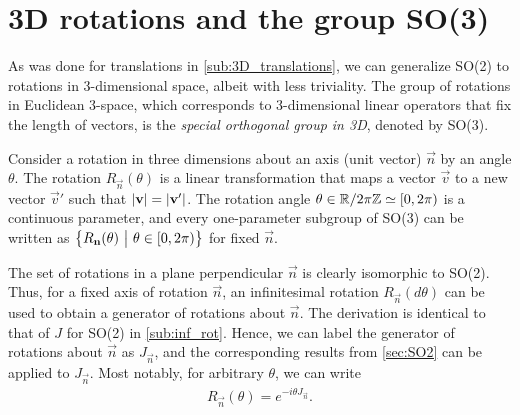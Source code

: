 \section{3D rotations and the group SO(3)}\label{sec:SO3}
As was done for translations in \cref{sub:3D_translations}, we can generalize SO(2) to rotations in 3-dimensional space, albeit with less triviality. The group of rotations in Euclidean 3-space, which corresponds to 3-dimensional linear operators that fix the length of vectors, is the \textit{special orthogonal group in 3D}, denoted by SO(3).

Consider a rotation in three dimensions about an axis (unit vector) $\vec{n}$ by an angle $\theta$. The rotation $R_{\vec{n}}(\theta)$ is a linear transformation that maps a vector $\vec{v}$ to a new vector $\vec{v}'$ such that $\left|\mathbf{v}\right|=\left|\mathbf{v}'\right|$. The rotation angle $\theta\in\mathbb{R}/2\pi\mathbb{Z}\simeq[0,2\pi)$ is a continuous parameter, and every one-parameter subgroup of SO(3) can be written as $\left\{ R_{\mathbf{n}}(\theta) ~\big|~ \theta\in[0,2\pi) \right\}$ for fixed $\vec{n}$.

The set of rotations in a plane perpendicular $\vec{n}$ is clearly isomorphic to SO(2). Thus, for a fixed axis of rotation $\vec{n}$, an infinitesimal rotation $R_{\vec{n}}(d\theta)$ can be used to obtain a generator of rotations about $\vec{n}$. The derivation is identical to that of $J$ for SO(2) in \cref{sub:inf_rot}. Hence, we can label the generator of rotations about $\vec{n}$ as $J_{\vec{n}}$, and the corresponding results from \cref{sec:SO2} can be applied to $J_{\vec{n}}$. Most notably, for arbitrary $\theta$, we can write
\begin{align}
    R_{\vec{n}}(\theta) = e^{-i\theta J_{\vec{n}}}.
\end{align}

